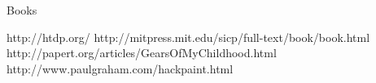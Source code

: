 \begin{rubric}{Books} 
\end{rubric}

\begin{center}
                      {http://htdp.org/}
                      {http://mitpress.mit.edu/sicp/full-text/book/book.html}
                      {http://papert.org/articles/GearsOfMyChildhood.html}
                      {http://www.paulgraham.com/hackpaint.html}

\end{center}
